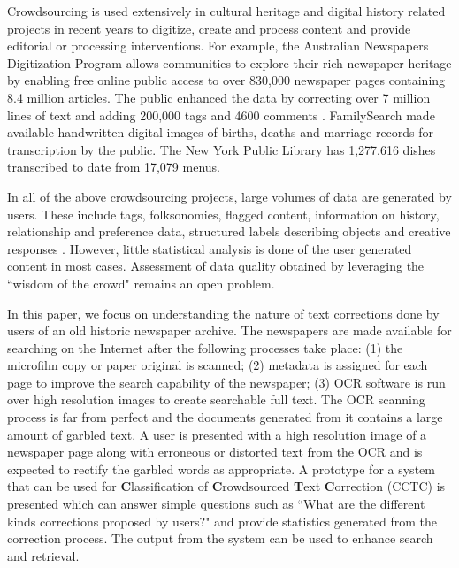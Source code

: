 \documentclass[10pt, conference, compsocconf]{IEEEtran}
\begin{document}
Crowdsourcing is used extensively in cultural heritage and digital history related projects in recent years to digitize, create and process content and provide editorial or processing interventions. For example, the Australian Newspapers Digitization Program \cite{ADNP} allows communities to explore their rich newspaper heritage by enabling free online public access to over 830,000 newspaper pages containing 8.4 million articles. The public enhanced the data by correcting over 7 million lines of text and adding 200,000 tags and 4600 comments \cite{holley_09}. 
FamilySearch \cite{famSearch} made available handwritten digital images of births, deaths and marriage records for transcription by the public. The New York Public Library has 1,277,616 dishes transcribed to date from 17,079 menus. 

In all of the above crowdsourcing projects, large volumes of data are generated by users. These include tags, folksonomies, flagged content, information on history, relationship and preference data, structured labels describing objects and creative responses \cite{Ridge_11}. However, little statistical analysis is done of the user generated content in most cases. Assessment of data quality obtained by leveraging the ``wisdom of the crowd" remains an open problem. 


In this paper, we focus on understanding the nature of text corrections done by users of an old historic newspaper archive. The newspapers are made available for searching on the Internet after the following processes take place: (1) the microfilm copy or paper original is scanned; %
(2) metadata is assigned for each page to improve the search capability of the newspaper; (3) OCR software is run over high resolution images to create searchable full text.
The OCR scanning process is far from perfect and the documents generated from it contains a large amount of garbled text. A user is presented with a high resolution image of a newspaper page along with erroneous or distorted text from the OCR and is expected to rectify the garbled words as appropriate. A prototype for a system that can be used for \textbf{C}lassification of \textbf{C}rowdsourced \textbf{T}ext \textbf{C}orrection (CCTC) is presented which can answer simple questions such as ``What are the different kinds corrections proposed by users?" and provide statistics generated from the correction process. The output from the system can be used to enhance search and retrieval.
\end{document}
